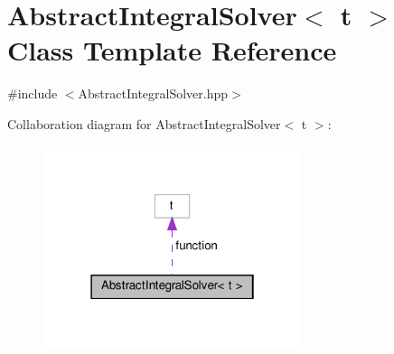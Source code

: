 \hypertarget{class_abstract_integral_solver}{}\section{Abstract\+Integral\+Solver$<$ t $>$ Class Template Reference}
\label{class_abstract_integral_solver}


{\ttfamily \#include $<$Abstract\+Integral\+Solver.\+hpp$>$}



Collaboration diagram for Abstract\+Integral\+Solver$<$ t $>$\+:\nopagebreak
\begin{figure}[H]
\begin{center}
\leavevmode
\includegraphics[width=214pt]{class_abstract_integral_solver__coll__graph}
\end{center}
\end{figure}
